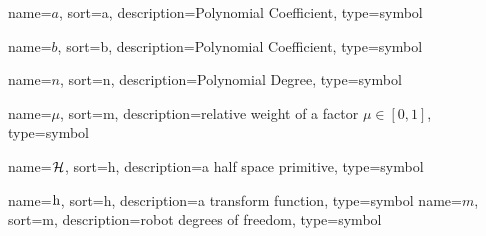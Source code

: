 	{%
		name=\ensuremath{a},
		sort=a,
		description=Polynomial Coefficient,
		type=symbol
	}
	\newcommand{\coefficient}{\gls{sym:coefficient}}

	{%
		name=\ensuremath{b},
		sort=b,
		description=Polynomial Coefficient,
		type=symbol
	}
	\newcommand{\coefficientb}{\gls{sym:coefficientb}}

	{%
		name=\ensuremath{n},
		sort=n,
		description=Polynomial Degree,
		type=symbol
	}
	\newcommand{\poldeg}{\gls{sym:poldeg}}

	{%
		name=\ensuremath{\mu},
		sort=m,
		description=relative weight of a factor \ensuremath{\mu \in [0, 1]},
		type=symbol
	}
	\newcommand{\relweight}{\gls{sym:relweight}}

	{%
		name=\ensuremath{\set{H}},
		sort=h,
		description=a half space primitive,
		type=symbol
	}
	\newcommand{\halfspaceprimitive}{\gls{sym:halfspaceprimitive}}

	{%
		name=\ensuremath{\func{h}},
		sort=h,
		description=a transform function,
		type=symbol
	}
	\newcommand{\transform}{\gls{sym:transform}}
	{%
		name=\ensuremath{m},
		sort=m,
		description=robot degrees of freedom,
		type=symbol
	}
	\newcommand{\robotdof}{\gls{sym:robotdof}}

